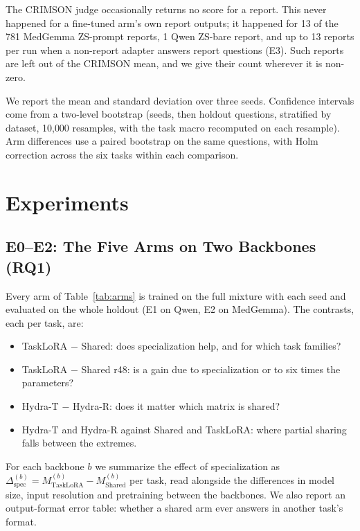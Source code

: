 \documentclass[journal,twoside,web]{ieeecolor}
\begin{document}
The CRIMSON judge occasionally returns no score for a report. This never
happened for a fine-tuned arm's own report outputs; it happened for 13 of the
781 MedGemma ZS-prompt reports, 1 Qwen ZS-bare report, and up to 13 reports
per run when a non-report adapter answers report questions (E3). Such reports
are left out of the CRIMSON mean, and we give their count wherever it is
non-zero.

We report the mean and standard deviation over three seeds. Confidence
intervals come from a two-level bootstrap (seeds, then holdout questions,
stratified by dataset, 10{,}000 resamples, with the task macro recomputed
on each resample). Arm differences use a paired bootstrap on the same
questions, with Holm correction across the six tasks within each
comparison.


\section{Experiments}
\label{sec:experiments}

\subsection{E0--E2: The Five Arms on Two Backbones (RQ1)}
\label{sec:e1}

Every arm of Table~\ref{tab:arms} is trained on the full mixture with each
seed and evaluated on the whole holdout (E1 on Qwen, E2 on MedGemma). The
contrasts, each per task, are:
\begin{itemize}
    \item TaskLoRA $-$ Shared: does specialization help, and for which task
    families?
    \item TaskLoRA $-$ Shared r48: is a gain due to specialization or to six
    times the parameters?
    \item Hydra-T $-$ Hydra-R: does it matter which matrix is shared?
    \item Hydra-T and Hydra-R against Shared and TaskLoRA: where partial
    sharing falls between the extremes.
\end{itemize}
For each backbone $b$ we summarize the effect of specialization as
$\Delta_{\mathrm{spec}}^{(b)}=M_{\mathrm{TaskLoRA}}^{(b)}-M_{\mathrm{Shared}}^{(b)}$
per task, read alongside the differences in model size, input resolution
and pretraining between the backbones. We also report an output-format error
table: whether a shared arm ever answers in another task's format.
\end{document}
